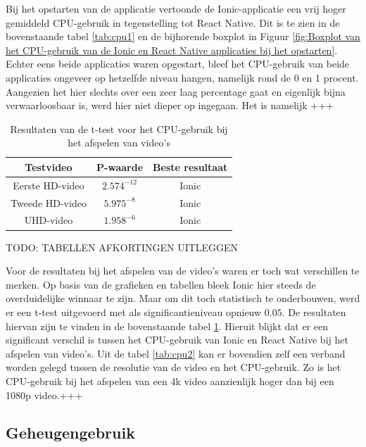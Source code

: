 Bij het opstarten van de applicatie vertoonde de Ionic-applicatie een vrij hoger gemiddeld CPU-gebruik in tegenstelling tot React Native. Dit is te zien in de bovenstaande tabel \ref{tab:cpu1} en de bijhorende boxplot in Figuur \ref{fig:Boxplot van het CPU-gebruik van de Ionic en React Native applicaties bij het opstarten}. Echter eens beide applicaties waren opgestart, bleef het CPU-gebruik van beide applicaties ongeveer op hetzelfde niveau hangen, namelijk rond de 0 en 1 procent. Aangezien het hier slechts over een zeer laag percentage gaat en eigenlijk bijna verwaarloosbaar is, werd hier niet dieper op ingegaan. Het is namelijk +++

\begin{table}[htbp]
  \centering
  \footnotesize
  \begin{tabular}{|c|c|c|}
      \hline
      \textbf{Testvideo} & \textbf{P-waarde} & \textbf{Beste resultaat} \\
      \hline
      Eerste HD-video & \(2.574^{-12}\) & Ionic \\
      \hline
      Tweede HD-video & \(5.975^{-8}\) & Ionic \\
      \hline
      UHD-video & \(1.958^{-6}\) & Ionic \\
      \hline
  \end{tabular}
  \caption{Resultaten van de t-test voor het CPU-gebruik bij het afspelen van video's}
  \label{tab:cpu_ttest}
\end{table}

TODO: TABELLEN AFKORTINGEN UITLEGGEN

Voor de resultaten bij het afspelen van de video's waren er toch wat verschillen te merken. Op basis van de grafieken en tabellen bleek Ionic hier steeds de overduidelijke winnaar te zijn. Maar om dit toch statistisch te onderbouwen, werd er een t-test uitgevoerd met als significantieniveau opnieuw \(0.05\). De resultaten hiervan zijn te vinden in de bovenstaande tabel \ref{tab:cpu_ttest}. Hieruit blijkt dat er een significant verschil is tussen het CPU-gebruik van Ionic en React Native bij het afspelen van video's. Uit de tabel \ref{tab:cpu2} kan er bovendien zelf een verband worden gelegd tussen de resolutie van de video en het CPU-gebruik. Zo is het CPU-gebruik bij het afspelen van een 4k video aanzienlijk hoger dan bij een 1080p video.+++


\subsection{Geheugengebruik}
\label{subsec:geheugengebruik}

